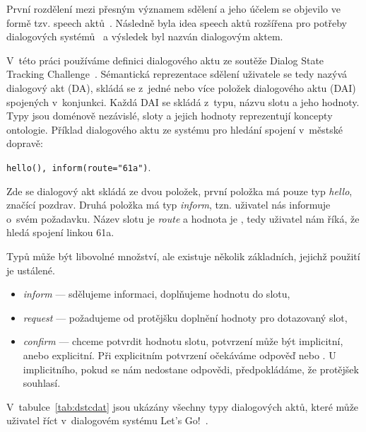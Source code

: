 První rozdělení mezi přesným významem sdělení a jeho účelem se objevilo ve formě tzv. speech aktů~\cite{austin1975things}.
Následně byla idea speech aktů rozšířena pro potřeby dialogových systémů~\cite{traum1999speech} a výsledek byl nazván dialogovým aktem.

V~této práci používáme definici dialogového aktu ze soutěže Dialog State Tracking Challenge~\cite{williamsdialog}.
Sémantická reprezentace sdělení uživatele se tedy nazývá dialogový akt (DA), skládá se z~jedné nebo více položek dialogového aktu (DAI) spojených v~konjunkci.
Každá DAI se skládá z~typu, názvu slotu a jeho hodnoty. 
Typy jsou doménově nezávislé, sloty a jejich hodnoty reprezentují koncepty ontologie.
Příklad dialogového aktu ze systému pro hledání spojení v~městské dopravě:

\begin{center}
{\tt hello(), inform(route="61a")}.
\end{center}

Zde se dialogový akt skládá ze dvou položek, první položka má pouze typ {\em hello}, značící pozdrav.
Druhá položka má typ {\em inform}, tzn. uživatel nás informuje o~svém požadavku.
Název slotu je {\em route} a hodnota je , tedy uživatel nám říká, že hledá spojení linkou 61a.

Typů může být libovolné množství, ale existuje několik základních, jejichž použití je ustálené.
\begin{itemize}
\item {\em inform} --- sdělujeme informaci, doplňujeme hodnotu do slotu,
\item {\em request} --- požadujeme od protějšku doplnění hodnoty pro dotazovaný slot,
\item {\em confirm} --- chceme potvrdit hodnotu slotu, potvrzení může být implicitní, anebo explicitní.
	Při explicitním potvrzení očekáváme odpověď  nebo .
	U implicitního, pokud se nám nedostane odpovědi, předpokládáme, že protějšek souhlasí.
\end{itemize}

V~tabulce~\ref{tab:dstcdat} jsou ukázány všechny typy dialogových aktů, které může uživatel říct v~dialogovém systému Let's Go!~\cite{williamsdialog}.

